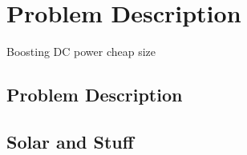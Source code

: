 \chapter{Problem Description}\label{ch:probdesc}
Boosting DC power
cheap
size


\section{Problem Description}


\section{Solar and Stuff}